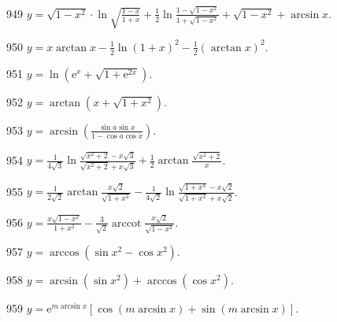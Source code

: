 \begin{prob}[S]{949}
$y = \sqrt{1 - x^2} \cdot \ln \sqrt{\frac{1 - x}{1 + x}} + \frac{1}{2} \ln \frac{1 - \sqrt{1 - x^2}}{1 + \sqrt{1 - x^2}} + \sqrt{1 - x^2} + \arcsin x$.
\end{prob}

\begin{prob}[S]{950}
$y = x\arctan x - \frac{1}{2} \ln(1 + x)^2 - \frac{1}{2} (\arctan x)^2$.
\end{prob}

\begin{prob}[S]{951}
$y = \ln(\mathrm{e}^x + \sqrt{1 + \mathrm{e}^{2x}})$.
\end{prob}

\begin{prob}[S]{952}
$y = \arctan(x + \sqrt{1 + x^2})$.
\end{prob}

\begin{prob}[S]{953}
$y = \arcsin \left( \frac{\sin a \sin x}{1 - \cos a \cos x} \right)$.
\end{prob}

\begin{prob}[S]{954}
$y = \frac{1}{4\sqrt{3}} \ln \frac{\sqrt{x^2 + 2} - x\sqrt{3}}{\sqrt{x^2 + 2} + x\sqrt{3}} + \frac{1}{2} \arctan \frac{\sqrt{x^2 + 2}}{x}$.
\end{prob}

\begin{prob}[S]{955}
$y = \frac{1}{2\sqrt{2}} \arctan \frac{x\sqrt{2}}{\sqrt{1 + x^4}} - \frac{1}{4\sqrt{2}} \ln \frac{\sqrt{1 + x^4} - x\sqrt{2}}{\sqrt{1 + x^4} + x\sqrt{2}}$.
\end{prob}

\begin{prob}[S]{956}
$y = \frac{x\sqrt{1 - x^2}}{1 + x^2} - \frac{3}{\sqrt{2}} \operatorname{arccot} \frac{x\sqrt{2}}{\sqrt{1 - x^2}}$.
\end{prob}

\begin{prob}[S]{957}
$y = \arccos(\sin x^2 - \cos x^2)$.
\end{prob}

\begin{prob}[S]{958}
$y = \arcsin(\sin x^2) + \arccos(\cos x^2)$.
\end{prob}

\begin{prob}[S]{959}
$y = \mathrm{e}^{m\arcsin x}[\cos(m\arcsin x) + \sin(m\arcsin x)]$.
\end{prob}

